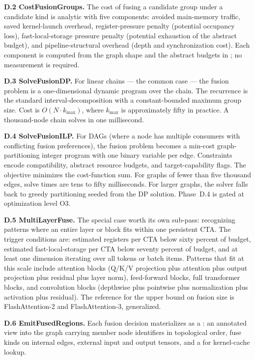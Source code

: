 \textbf{D.2 CostFusionGroups.}
The cost of fusing a candidate group under a candidate kind is analytic with five components: avoided main-memory traffic, saved kernel-launch overhead, register-pressure penalty (potential occupancy loss), fast-local-storage pressure penalty (potential exhaustion of the abstract budget), and pipeline-structural overhead (depth and synchronization cost).
Each component is computed from the graph shape and the abstract budgets in ; no measurement is required.

\textbf{D.3 SolveFusionDP.}
For linear chains --- the common case --- the fusion problem is a one-dimensional dynamic program over the chain.
The recurrence is the standard interval-decomposition with a constant-bounded maximum group size.
Cost is $O(N \cdot k_\text{max})$, where $k_\text{max}$ is approximately fifty in practice.
A thousand-node chain solves in one millisecond.

\textbf{D.4 SolveFusionILP.}
For DAGs (where a node has multiple consumers with conflicting fusion preferences), the fusion problem becomes a min-cost graph-partitioning integer program with one binary variable per edge.
Constraints encode  compatibility, abstract resource budgets, and target-capability flags.
The objective minimizes the cost-function sum.
For graphs of fewer than five thousand edges, solve times are tens to fifty milliseconds.
For larger graphs, the solver falls back to greedy partitioning seeded from the DP solution.
Phase~D.4 is gated at optimization level O3.

\textbf{D.5 MultiLayerFuse.}
The special case worth its own sub-pass: recognizing patterns where an entire layer or block fits within one persistent CTA.
The trigger conditions are: estimated registers per CTA below sixty percent of budget, estimated fast-local-storage per CTA below seventy percent of budget, and at least one dimension iterating over all tokens or batch items.
Patterns that fit at this scale include attention blocks (Q/K/V projection plus attention plus output projection plus residual plus layer norm), feed-forward blocks, full transformer blocks, and convolution blocks (depthwise plus pointwise plus normalization plus activation plus residual).
The reference for the upper bound on fusion size is FlashAttention-2 and FlashAttention-3, generalized.

\textbf{D.6 EmitFusedRegions.}
Each fusion decision materializes as a : an annotated view into the  graph carrying member node identifiers in topological order, fuse kinds on internal edges, external input and output tensors, and a  for kernel-cache lookup.


